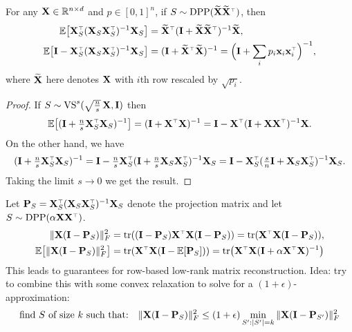 \documentclass[12pt]{sty/colt2019/colt2018-arxiv}
\begin{document}
\begin{theorem}
  For any $\mathbf X\in\mathbb R^{n\times d}$ and $p\in[0,1]^n$, if $S\sim\DPP(\Xt\Xt^\top)$, then
  \begin{align*}
    \E\big[\X_S^\top(\X_S\X_S^\top)^{-1}\X_S\big] &=
    \Xt^\top(\I+\Xt\Xt^\top)^{-1}\Xt,\\
    \E\big[\I-\X_S^\top(\X_S\X_S^\top)^{-1}\X_S\big] &= (\I +
    \Xt^\top\Xt)^{-1} = \Big(\I + \sum_ip_i\x_i\x_i^\top\Big)^{-1},
  \end{align*}
  where $\widetilde{\mathbf{X}}$ here denotes $\mathbf X$ with $i$th row rescaled by $\sqrt{p_i}$.
\end{theorem}
\begin{proof}
  If $S \sim {\mathrm{VS}}^s(\sqrt{\frac ns}\,\mathbf X,\mathbf I)$ then
  \begin{align*}
    \E\big[(\I + \tfrac ns\X_S^\top\X_S)^{-1}\big] =
    (\I+\X^\top\X)^{-1} = \I - \X^\top(\I+\X\X^\top)^{-1}\X.
  \end{align*}
  On the other hand, we have
  \begin{align*}
    (\I + \tfrac ns\X_S^\top\X_S)^{-1} = \I - \tfrac
    ns\X_S^\top(\I+\tfrac ns\X_S\X_S^\top)^{-1}\X_S = \I -
    \X_S^\top(\tfrac sn\I+\X_S\X_S^\top)^{-1}\X_S.
  \end{align*}
  Taking the limit $s\rightarrow 0$ we get the result.
\end{proof}
Let $\P_S = \X_S^\top(\X_S\X_S^\top)^{-1}\X_S$ denote the projection
matrix and let $S\sim\DPP(\alpha\X\X^\top)$.
\begin{align*}
\|\X(\I-\P_S)\|_F^2 &= \tr((\I - \P_S)\X^\top\X(\I-\P_S))=
  \tr(\X^\top\X(\I-\P_S)),\\
  \E\big[\|\X(\I-\P_S)\|_F^2\big] &= \tr(\X^\top\X(\I-\E[\P_S])) = \tr\big(\X^\top\X(\I+\alpha\X^\top\X)^{-1}\big)
\end{align*}
This leads to guarantees for row-based low-rank matrix
reconstruction. Idea: try to combine this with some convex relaxation
to solve for a $(1+\epsilon)$-approximation:
\[\text{find $S$ of size $k$ such that:} \quad
  \|\mathbf X(\mathbf I-\mathbf P_S)\|_F^2\leq (1+\epsilon)\min_{S':|S'|=k} \|\mathbf X(\mathbf I-\mathbf P_{S'})\|_F^2\] 
\end{document}
